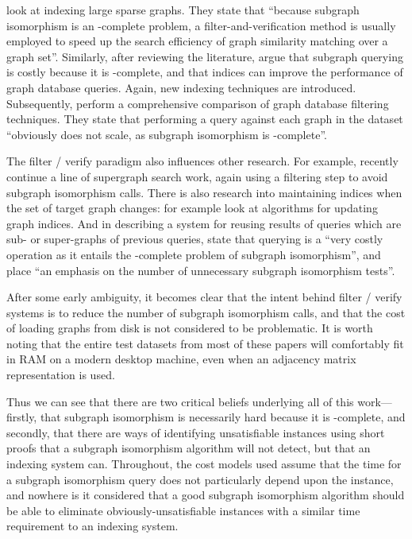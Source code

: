 \documentclass[twoside,11pt]{article}
\newcommand{\citet}[1]{\citeA{#1}}
\begin{document}
\citet{DBLP:journals/tkde/WangWYY12} look at indexing large sparse graphs. They state that ``because
subgraph isomorphism is an \NP-complete problem, a filter-and-verification method is usually
employed to speed up the search efficiency of graph similarity matching over a graph set''.
Similarly, after reviewing the literature, \citet{DBLP:journals/vldb/YuanM13} argue that subgraph
querying is costly because it is \NP-complete, and that indices can improve the performance of graph
database queries. Again, new indexing techniques are introduced.  Subsequently,
\citet{DBLP:journals/pvldb/KatsarouNT15} perform a comprehensive comparison of graph database
filtering techniques. They state that performing a query against each graph in the dataset
``obviously does not scale, as subgraph isomorphism is \NP-complete''.

The filter / verify paradigm also influences other research. For example, recently
\citet{DBLP:journals/pvldb/YuanMG13} continue a line of supergraph search work, again using a
filtering step to avoid subgraph isomorphism calls. There is also research into maintaining indices
when the set of target graph changes: for example \citet{DBLP:conf/sigmod/YuanMYG15} look at
algorithms for updating graph indices. And in describing a system for reusing results of queries
which are sub- or super-graphs of previous queries, \citet{DBLP:conf/edbt/WangNT16} state that
querying is a ``very costly operation as it entails the \NP-complete problem of subgraph
isomorphism'', and place ``an emphasis on the number of unnecessary subgraph isomorphism tests''.

After some early ambiguity, it becomes clear that the intent behind filter / verify systems is to
reduce the number of subgraph isomorphism calls, and that the cost of loading graphs from disk is
not considered to be problematic. It is worth noting that the entire test datasets from most of
these papers will comfortably fit in RAM on a modern desktop machine, even when an adjacency matrix
representation is used.

Thus we can see that there are two critical beliefs underlying all of this work---firstly, that
subgraph isomorphism is necessarily hard because it is \NP-complete, and secondly, that there are
ways of identifying unsatisfiable instances using short proofs that a subgraph isomorphism algorithm
will not detect, but that an indexing system can. Throughout, the cost models used assume that the
time for a subgraph isomorphism query does not particularly depend upon the instance, and nowhere is
it considered that a good subgraph isomorphism algorithm should be able to eliminate
obviously-unsatisfiable instances with a similar time requirement to an indexing system.
\end{document}
